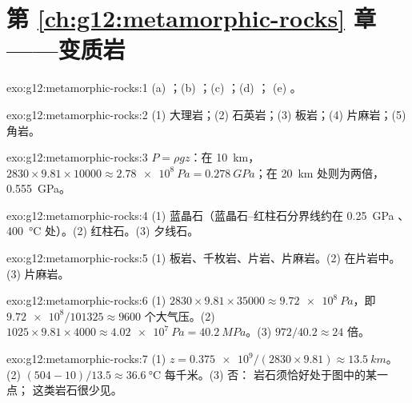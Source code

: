 \section*{第 \ref{ch:g12:metamorphic-rocks} 章——变质岩}

\begin{solution}{exo:g12:metamorphic-rocks:1}
(a) ；(b) ；(c) ；(d) ；
(e) 。
\end{solution}

\begin{solution}{exo:g12:metamorphic-rocks:2}
(1) 大理岩；(2) 石英岩；(3) 板岩；(4) 片麻岩；(5) 角岩。
\end{solution}

\begin{solution}{exo:g12:metamorphic-rocks:3}
$P = \rho g z$：在 \qty{10}{km}，$2830 \times 9.81 \times \num{10000} \approx
\qty{2.78e8}{Pa} = \qty{0.278}{GPa}$；在 \qty{20}{km} 处则为两倍，
\qty{0.555}{GPa}。
\end{solution}

\begin{solution}{exo:g12:metamorphic-rocks:4}
(1) 蓝晶石（蓝晶石–红柱石分界线约在 \qty{0.25}{GPa}
、\qty{400}{\celsius} 处）。(2) 红柱石。(3) 夕线石。
\end{solution}

\begin{solution}{exo:g12:metamorphic-rocks:5}
(1) 板岩、千枚岩、片岩、片麻岩。(2) 在片岩中。(3) 片麻岩。
\end{solution}

\begin{solution}{exo:g12:metamorphic-rocks:6}
(1) $2830 \times 9.81 \times \num{35000} \approx \qty{9.72e8}{Pa}$，即
$\num{9.72e8}/101325 \approx \num{9600}$ 个大气压。(2) $1025 \times 9.81
\times 4000 \approx \qty{4.02e7}{Pa} = \qty{40.2}{MPa}$。(3) $972/40.2
\approx 24$ 倍。
\end{solution}

\begin{solution}{exo:g12:metamorphic-rocks:7}
(1) $z = \num{0.375e9}/(2830 \times 9.81) \approx \qty{13.5}{km}$。
(2) $(504 - 10)/13.5 \approx \qty{36.6}{\celsius}$ 每千米。(3) 否：
岩石须恰好处于图中的某一点；
这类岩石很少见。
\end{solution}

